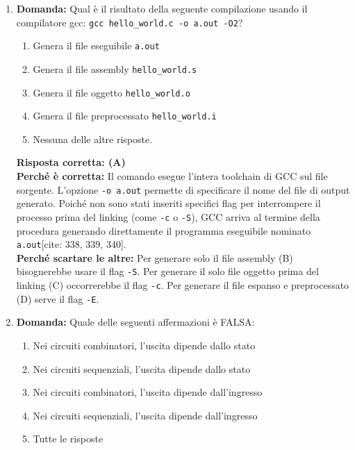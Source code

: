 \documentclass[12pt, a4paper]{article}
\begin{document}
\begin{enumerate}
    \item \textbf{Domanda:} Qual è il risultato della seguente compilazione usando il compilatore gcc: \texttt{gcc hello\_world.c -o a.out -O2}?
    \begin{enumerate}[label=(\Alph*)]
        \item Genera il file eseguibile \texttt{a.out}
        \item Genera il file assembly \texttt{hello\_world.s}
        \item Genera il file oggetto \texttt{hello\_world.o}
        \item Genera il file preprocessato \texttt{hello\_world.i}
        \item Nessuna delle altre risposte.
    \end{enumerate}
    \textbf{Risposta corretta: (A)} \\
    \textbf{Perché è corretta:} Il comando esegue l'intera toolchain di GCC sul file sorgente. L'opzione \texttt{-o a.out} permette di specificare il nome del file di output generato. Poiché non sono stati inseriti specifici flag per interrompere il processo prima del linking (come \texttt{-c} o \texttt{-S}), GCC arriva al termine della procedura generando direttamente il programma eseguibile nominato \texttt{a.out}[cite: 338, 339, 340]. \\
    \textbf{Perché scartare le altre:} Per generare solo il file assembly (B) bisognerebbe usare il flag \texttt{-S}. Per generare il solo file oggetto prima del linking (C) occorrerebbe il flag \texttt{-c}. Per generare il file espanso e preprocessato (D) serve il flag \texttt{-E}.

    \item \textbf{Domanda:} Quale delle seguenti affermazioni è FALSA:
    \begin{enumerate}[label=(\Alph*)]
        \item Nei circuiti combinatori, l'uscita dipende dallo stato
        \item Nei circuiti sequenziali, l'uscita dipende dallo stato
        \item Nei circuiti combinatori, l'uscita dipende dall'ingresso
        \item Nei circuiti sequenziali, l'uscita dipende dall'ingresso
        \item Tutte le risposte
    \end{enumerate}

\newpage
    

\end{enumerate}
\end{document}
